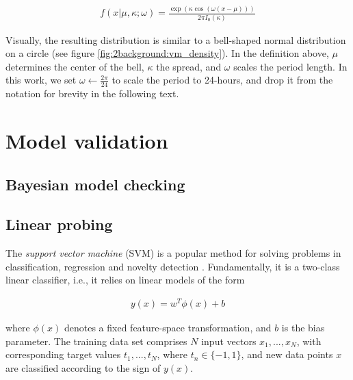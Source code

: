 \begin{align}
    f(x | \mu, \kappa ; \omega) = \frac{\exp (\kappa \cos (\omega (x - \mu)))}{2 \pi I_0(\kappa)}
    \label{eq:2background:vm_density}
\end{align}

Visually, the resulting distribution is similar to a bell-shaped normal distribution on a circle (see figure \ref{fig:2background:vm_density}). In the definition above, $\mu$ determines the center of the bell,  $\kappa$ the spread, and $\omega$ scales the period length. In this work, we set $\omega \gets \frac{2\pi}{24}$ to scale the period to 24-hours, and drop it from the notation for brevity in the following text.





\section{Model validation}

\subsection{Bayesian model checking}

\subsection{Linear probing}
The \emph{support vector machine} (SVM) is a popular method for solving problems in classification, regression and novelty detection \cite{bishop2006pattern}. Fundamentally, it is a two-class linear classifier, i.e., it relies on linear models of the form

\begin{align}
    y(x) = w^T \phi(x) + b
\end{align}

where $\phi(x)$ denotes a fixed feature-space transformation, and $b$ is the bias parameter. The training data set comprises $N$ input vectors $x_1,..., x_N$, with corresponding target values $t_1, ..., t_N$, where $t_n \in \{-1, 1\}$, and new data points $x$ are classified according to the sign of $y(x)$.

